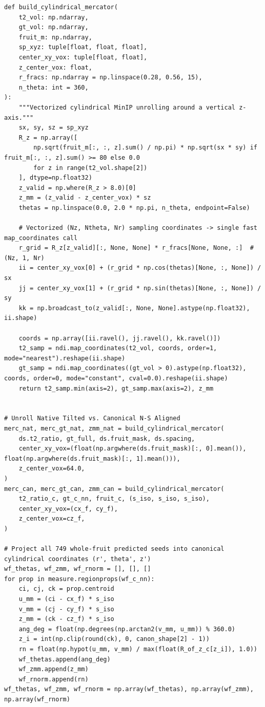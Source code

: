 \documentclass[10pt,a4paper]{article}
\renewcommand{\_}{\origunderscore\allowbreak}
\begin{document}
\begin{codebox}
\begin{lstlisting}[style=pybmed]
def build_cylindrical_mercator(
    t2_vol: np.ndarray,
    gt_vol: np.ndarray,
    fruit_m: np.ndarray,
    sp_xyz: tuple[float, float, float],
    center_xy_vox: tuple[float, float],
    z_center_vox: float,
    r_fracs: np.ndarray = np.linspace(0.28, 0.56, 15),
    n_theta: int = 360,
):
    """Vectorized cylindrical MinIP unrolling around a vertical z-axis."""
    sx, sy, sz = sp_xyz
    R_z = np.array([
        np.sqrt(fruit_m[:, :, z].sum() / np.pi) * np.sqrt(sx * sy) if fruit_m[:, :, z].sum() >= 80 else 0.0
        for z in range(t2_vol.shape[2])
    ], dtype=np.float32)
    z_valid = np.where(R_z > 8.0)[0]
    z_mm = (z_valid - z_center_vox) * sz
    thetas = np.linspace(0.0, 2.0 * np.pi, n_theta, endpoint=False)

    # Vectorized (Nz, Ntheta, Nr) sampling coordinates -> single fast map_coordinates call
    r_grid = R_z[z_valid][:, None, None] * r_fracs[None, None, :]  # (Nz, 1, Nr)
    ii = center_xy_vox[0] + (r_grid * np.cos(thetas)[None, :, None]) / sx
    jj = center_xy_vox[1] + (r_grid * np.sin(thetas)[None, :, None]) / sy
    kk = np.broadcast_to(z_valid[:, None, None].astype(np.float32), ii.shape)

    coords = np.array([ii.ravel(), jj.ravel(), kk.ravel()])
    t2_samp = ndi.map_coordinates(t2_vol, coords, order=1, mode="nearest").reshape(ii.shape)
    gt_samp = ndi.map_coordinates((gt_vol > 0).astype(np.float32), coords, order=0, mode="constant", cval=0.0).reshape(ii.shape)
    return t2_samp.min(axis=2), gt_samp.max(axis=2), z_mm


# Unroll Native Tilted vs. Canonical N-S Aligned
merc_nat, merc_gt_nat, zmm_nat = build_cylindrical_mercator(
    ds.t2_ratio, gt_full, ds.fruit_mask, ds.spacing,
    center_xy_vox=(float(np.argwhere(ds.fruit_mask)[:, 0].mean()), float(np.argwhere(ds.fruit_mask)[:, 1].mean())),
    z_center_vox=64.0,
)
merc_can, merc_gt_can, zmm_can = build_cylindrical_mercator(
    t2_ratio_c, gt_c_nn, fruit_c, (s_iso, s_iso, s_iso),
    center_xy_vox=(cx_f, cy_f),
    z_center_vox=cz_f,
)

# Project all 749 whole-fruit predicted seeds into canonical cylindrical coordinates (r', theta', z')
wf_thetas, wf_zmm, wf_rnorm = [], [], []
for prop in measure.regionprops(wf_c_nn):
    ci, cj, ck = prop.centroid
    u_mm = (ci - cx_f) * s_iso
    v_mm = (cj - cy_f) * s_iso
    z_mm = (ck - cz_f) * s_iso
    ang_deg = float(np.degrees(np.arctan2(v_mm, u_mm)) % 360.0)
    z_i = int(np.clip(round(ck), 0, canon_shape[2] - 1))
    rn = float(np.hypot(u_mm, v_mm) / max(float(R_of_z_c[z_i]), 1.0))
    wf_thetas.append(ang_deg)
    wf_zmm.append(z_mm)
    wf_rnorm.append(rn)
wf_thetas, wf_zmm, wf_rnorm = np.array(wf_thetas), np.array(wf_zmm), np.array(wf_rnorm)


\end{lstlisting}
\end{codebox}
\end{document}
